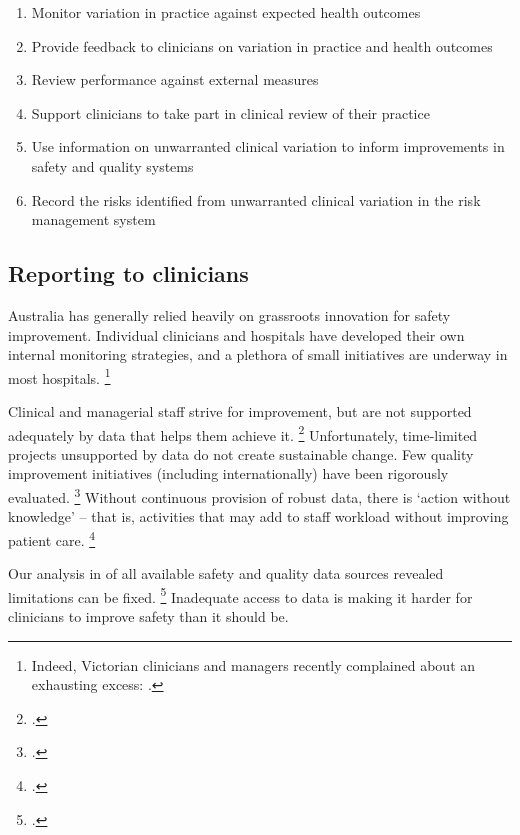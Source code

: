 \documentclass[FrontPage]{grattan}
\begin{document}
\begin{enumerate}
	\renewcommand{\labelenumi}{\bfseries\color{Orange}\alph{enumi}. }
	\item Monitor variation in practice against expected health outcomes
	\item Provide feedback to clinicians on variation in practice and health outcomes
	\item Review performance against external measures
	\item Support clinicians to take part in clinical review of their practice
	\item Use information on unwarranted clinical variation to inform improvements in safety and quality systems
	\item Record the risks identified from unwarranted clinical variation in the risk management system
\end{enumerate}

\subsection{Reporting to clinicians}\label{subsec:reporting-to-clinicians}

Australia has generally relied heavily on grassroots innovation for safety improvement.
Individual clinicians and hospitals have developed their own internal monitoring strategies, and a plethora of small initiatives are underway in most hospitals.%
	\footnote{Indeed, Victorian clinicians and managers recently complained about an exhausting excess: \textcite{Jorm-2017-Clinical-engagement}.}

Clinical and managerial staff strive for improvement, but are not supported adequately by data that helps them achieve it.%
	\footcite{leggat2017qualitative}
Unfortunately, time-limited projects unsupported by data do not create sustainable change.
Few quality improvement initiatives (including internationally) have been rigorously evaluated.%
	\footcites{Nicolay_2011}{Jones_2016}{Dixon-Woods-Martin-2016-Does-QI-improve-quality}{dixonwoods2016patient}{walsh2014undetermined}
Without continuous provision of robust data, there is `action without knowledge' -- that is, activities that may add to staff workload without improving patient care.%
	\footcites{pronovost2017creating}{kreindler2016what}{Hoog-2016-Quality-improvement-large-orgs}

Our analysis in  of all available safety and quality data sources revealed limitations can be fixed.%
	\footcite{DuckettEtAl-2017-Strengthening-safety-statistics}
Inadequate access to data is making it harder for clinicians to improve safety than it should be.
\end{document}
